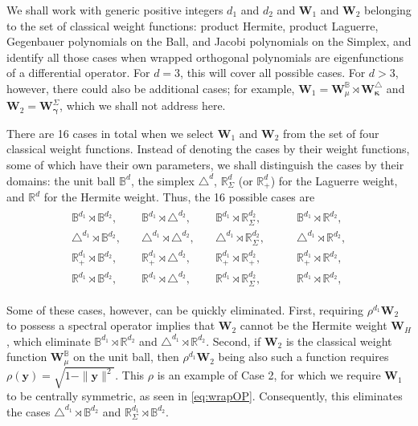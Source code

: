 \documentclass{amsart}
\theoremstyle{remark}
\def\yb{{\bm y}}
\def\Wb{{\bm W}}
\def\BB{{\mathbb B}}
\def\RR{{\mathbb R}}
\def\bg{{\boldsymbol{\gamma}}}
\def\bk{{\boldsymbol{\kappa}}}
\begin{document}
We shall work with generic positive integers $d_1$ and $d_2$ and $\Wb_1$ and $\Wb_2$ belonging to 
the set of classical weight functions: product Hermite, product Laguerre, Gegenbauer polynomials on 
the Ball, and Jacobi polynomials on the Simplex, and identify all those cases when wrapped orthogonal 
polynomials are eigenfunctions of a differential operator. For $d = 3$, this will cover all possible cases. 
For $d > 3$, however, there could also be additional cases; for example, $\Wb_1 = 
\Wb_\mu^\BB \rtimes \Wb_\bk^\triangle$ and $\Wb_2 = \Wb_\bg^\Sigma$, which we shall not address here. 

There are 16 cases in total when we select $\Wb_1$ and $\Wb_2$ from the set of four classical weight functions. 
Instead of denoting the cases by their weight functions, some of which have their own parameters, we shall
distinguish the cases by their domains: the unit ball $\BB^d$, the simplex $\triangle^d$, $\RR_\Sigma^d$ 
(or $\RR_+^d$) for the Laguerre weight, and $\RR^d$ for the Hermite weight. Thus, the 16 possible cases are 
\begin{align}\label{eq:classes}
  \begin{matrix}  \BB^{d_1} \rtimes \BB^{d_2}, & \quad  \BB^{d_1} \rtimes \triangle^{d_2}, \quad &
    \BB^{d_1} \rtimes \RR_\Sigma^{d_2}, \quad & \quad \BB^{d_1} \rtimes \RR^{d_2},\\
     \triangle^{d_1} \rtimes \BB^{d_2}, & \quad  \triangle^{d_1} \rtimes \triangle^{d_2}, \quad &
    \triangle^{d_1} \rtimes \RR_\Sigma^{d_2}, \quad & \quad \triangle^{d_1} \rtimes \RR^{d_2}, \\
     \RR_+^{d_1} \rtimes \BB^{d_2}, & \quad  \RR_+^{d_1} \rtimes \triangle^{d_2}, \quad &
     \RR_+^{d_1} \rtimes \RR_+^{d_2}, \quad & \quad  \RR_+^{d_1} \rtimes \RR^{d_2},\\
     \RR^{d_1} \rtimes \BB^{d_2}, & \quad  \RR^{d_1}\rtimes \triangle^{d_2}, \quad &
      \RR^{d_1} \rtimes \RR_\Sigma^{d_2}, \quad & \quad   \RR^{d_1} \rtimes \RR^{d_2},
      \end{matrix}
 \end{align}

Some of these cases, however, can be quickly eliminated. First, requiring $\rho^{d_1} \Wb_2$ to possess 
a spectral operator implies that $\Wb_2$ cannot be the Hermite weight $\Wb_H$, which eliminate 
$\BB^{d_1} \rtimes \RR^{d_2}$ and $\triangle^{d_1} \rtimes \RR^{d_2}$. Second, if $\Wb_2$ is the 
classical weight function $\Wb_\mu^\BB$ on the unit ball, then $\rho^{d_1} \Wb_2$ being also such 
a function requires $\rho(\yb) = \sqrt{1- \|\yb\|^2}$. This $\rho$ is an example of Case 2, 
for which we require $\Wb_1$ to be centrally symmetric, as seen in \eqref{eq:wrapOP}. Consequently, 
this eliminates the cases $\triangle^{d_1} \rtimes \BB^{d_2}$ and $ \RR_\Sigma^{d_1} \rtimes \BB^{d_2}$. 
\end{document}
